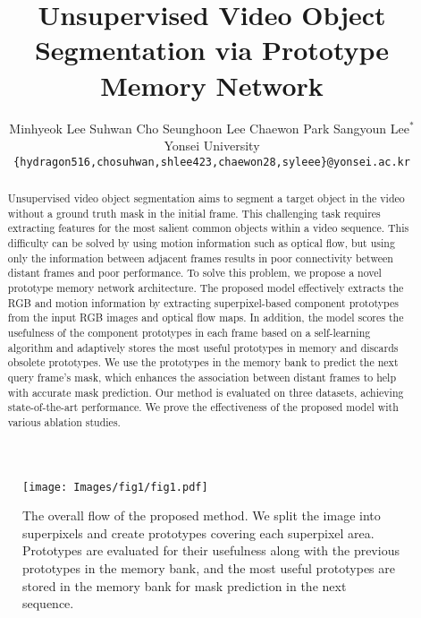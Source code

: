 \documentclass[10pt,twocolumn,letterpaper]{article}
\begin{document}
\title{Unsupervised Video Object Segmentation via Prototype Memory Network}

\author{
	Minhyeok Lee \quad
	Suhwan Cho \quad
	Seunghoon Lee \quad
	Chaewon Park \quad
	Sangyoun Lee$^{*}$ \quad
\vspace{0.01cm}\\
	Yonsei University \\
	{\tt\small \{hydragon516,chosuhwan,shlee423,chaewon28,syleee\}@yonsei.ac.kr}
}

\maketitle
\thispagestyle{empty}

\begin{abstract}
	Unsupervised video object segmentation aims to segment a target object in the video without a ground truth mask in the initial frame. This challenging task requires extracting features for the most salient common objects within a video sequence. This difficulty can be solved by using motion information such as optical flow, but using only the information between adjacent frames results in poor connectivity between distant frames and poor performance. To solve this problem, we propose a novel prototype memory network architecture. The proposed model effectively extracts the RGB and motion information by extracting superpixel-based component prototypes from the input RGB images and optical flow maps. In addition, the model scores the usefulness of the component prototypes in each frame based on a self-learning algorithm and adaptively stores the most useful prototypes in memory and discards obsolete prototypes. We use the prototypes in the memory bank to predict the next query frame’s mask, which enhances the association between distant frames to help with accurate mask prediction. Our method is evaluated on three datasets, achieving state-of-the-art performance. We prove the effectiveness of the proposed model with various ablation studies.
\end{abstract}

\begin{figure}[t]
	\setlength{\belowcaptionskip}{-24pt}
	\begin{center}
		\texttt{[image: Images/fig1/fig1.pdf]}
		\caption{The overall flow of the proposed method. We split the image into superpixels and create prototypes covering each superpixel area. Prototypes are evaluated for their usefulness along with the previous prototypes in the memory bank, and the most useful prototypes are stored in the memory bank for mask prediction in the next sequence.}
		\label{fig:intro}
	\end{center}
\end{figure}
\end{document}

